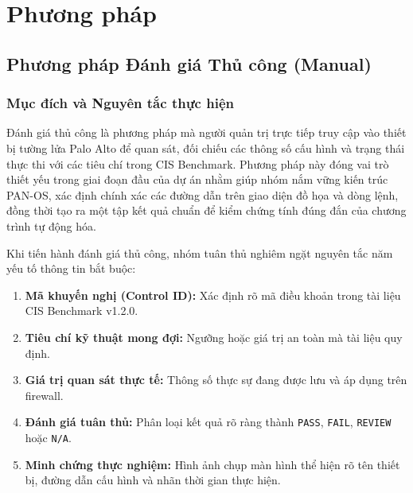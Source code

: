 \documentclass[12pt,a4paper]{article}
\begin{document}
\section{Phương pháp}

\subsection{Phương pháp Đánh giá Thủ công (Manual)}

\subsubsection{Mục đích và Nguyên tắc thực hiện}
Đánh giá thủ công là phương pháp mà người quản trị trực tiếp truy cập vào thiết bị tường lửa Palo Alto để quan sát, đối chiếu các thông số cấu hình và trạng thái thực thi với các tiêu chí trong CIS Benchmark. Phương pháp này đóng vai trò thiết yếu trong giai đoạn đầu của dự án nhằm giúp nhóm nắm vững kiến trúc PAN-OS, xác định chính xác các đường dẫn trên giao diện đồ họa và dòng lệnh, đồng thời tạo ra một tập kết quả chuẩn để kiểm chứng tính đúng đắn của chương trình tự động hóa.

Khi tiến hành đánh giá thủ công, nhóm tuân thủ nghiêm ngặt nguyên tắc năm yếu tố thông tin bắt buộc:
\begin{enumerate}
    \item \textbf{Mã khuyến nghị (Control ID):} Xác định rõ mã điều khoản trong tài liệu CIS Benchmark v1.2.0.
    \item \textbf{Tiêu chí kỹ thuật mong đợi:} Ngưỡng hoặc giá trị an toàn mà tài liệu quy định.
    \item \textbf{Giá trị quan sát thực tế:} Thông số thực sự đang được lưu và áp dụng trên firewall.
    \item \textbf{Đánh giá tuân thủ:} Phân loại kết quả rõ ràng thành \texttt{PASS}, \texttt{FAIL}, \texttt{REVIEW} hoặc \texttt{N/A}.
    \item \textbf{Minh chứng thực nghiệm:} Hình ảnh chụp màn hình thể hiện rõ tên thiết bị, đường dẫn cấu hình và nhãn thời gian thực hiện.
\end{enumerate}
\end{document}
